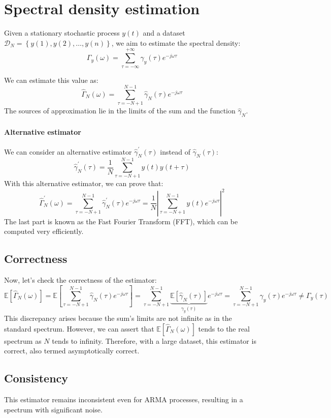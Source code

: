 \section{Spectral density estimation}

Given a stationary stochastic process $y(t)$ and a dataset $\mathcal{D}_N=\left\{ y(1),y(2),\dots,y(n) \right\}$, we aim to estimate the spectral density:
\[\Gamma_y(\omega)=\sum_{\tau=-\infty}^{+\infty}\gamma_y(\tau)e^{-j\omega\tau}\]

We can estimate this value as:
\[\hat{\Gamma}_N(\omega)=\sum_{\tau=-N+1}^{N-1}\hat{\gamma}_N(\tau)e^{-j\omega\tau}\]
The sources of approximation lie in the limits of the sum and the function $\hat{\gamma}_N$. 

\paragraph*{Alternative estimator}
We can consider an alternative estimator $\hat{\gamma}_N^\prime(\tau)$ instead of $\hat{\gamma}_N(\tau)$: 
\[\hat{\gamma}_N^\prime(\tau)=\dfrac{1}{N}\sum_{\tau=-N+1}^{N-1} y(t)y(t+\tau)\]
With this alternative estimator, we can prove that:
\[\hat{\Gamma}_N^\prime(\omega)=\sum_{\tau=-N+1}^{N-1}\hat{\gamma}_N^\prime(\tau)e^{-j\omega\tau}=\dfrac{1}{N}\left\lvert \sum_{\tau=-N+1}^{N-1}y(t)e^{-j\omega\tau}\right\rvert^2 \]
The last part is known as the Fast Fourier Transform (FFT), which can be computed very efficiently.

\subsection{Correctness}
Now, let's check the correctness of the estimator:
\[\mathbb{E}\left[ \hat{\Gamma}_N(\omega) \right]=\mathbb{E}\left[ \sum_{\tau=-N+1}^{N-1}\hat{\gamma}_N(\tau)e^{-j\omega\tau}\right]=\sum_{\tau=-N+1}^{N-1}\underbrace{\mathbb{E}\left[\hat{\gamma}_N(\tau)\right]}_{\gamma_y(\tau)} e^{-j\omega\tau}=\sum_{\tau=-N+1}^{N-1}\gamma_y(\tau) e^{-j\omega\tau}\neq\Gamma_y(\tau) \]
This discrepancy arises because the sum's limits are not infinite as in the standard spectrum. 
However, we can assert that $\mathbb{E}\left[ \hat{\Gamma}_N(\omega) \right]$ tends to the real spectrum as $N$ tends to infinity. 
Therefore, with a large dataset, this estimator is correct, also termed asymptotically correct.

\subsection{Consistency}
This estimator remains inconsistent even for ARMA processes, resulting in a spectrum with significant noise.

